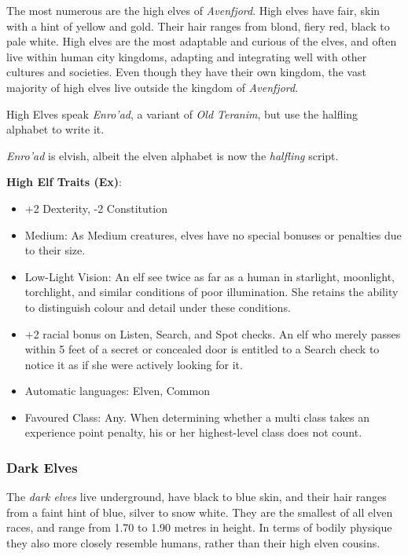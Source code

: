 The most numerous are the high elves of \emph{Avenfjord}. High elves have
fair, skin with a hint of yellow and gold. Their hair ranges from blond, fiery
red, black to pale white. High elves are the most adaptable and curious of the
elves, and often live within human city kingdoms, adapting and integrating
well with other cultures and societies. Even though they have their own
kingdom, the vast majority of high elves live outside the kingdom
of \emph{Avenfjord}.

High Elves speak \emph{Enro'ad}, a variant of \emph{Old Teranim}, but use the
halfling alphabet to write it.

\begin{35e}
  \emph{Enro'ad} is elvish, albeit the elven alphabet is now the \emph{halfling}
  script.

  \textbf{High Elf Traits (Ex)}:
  \begin{itemize}[noitemsep]
    \item +2 Dexterity, -2 Constitution
    \item Medium: As Medium creatures, elves have no special bonuses or
    penalties due to their size.
    \item Low-Light Vision: An elf see twice as far as a human in starlight,
    moonlight, torchlight, and similar conditions of poor illumination. She
    retains the ability to distinguish colour and detail under these
    conditions.
    \item +2 racial bonus on Listen, Search, and Spot checks. An elf who
    merely passes within 5 feet of a secret or concealed door is entitled to a
    Search check to notice it as if she were actively looking for it.
    \item Automatic languages: Elven, Common
    \item Favoured Class: Any. When determining whether a multi class takes an
    experience point penalty, his or her highest-level class does not count.
  \end{itemize}
\end{35e}

\subsubsection*{Dark Elves}

The \emph{dark elves} live underground, have black to blue skin, and their
hair ranges from a faint hint of blue, silver to snow white. They are the
smallest of all elven races, and range from 1.70 to 1.90 metres in height.
In terms of bodily physique they also more closely resemble humans, rather
than their high elven cousins.

